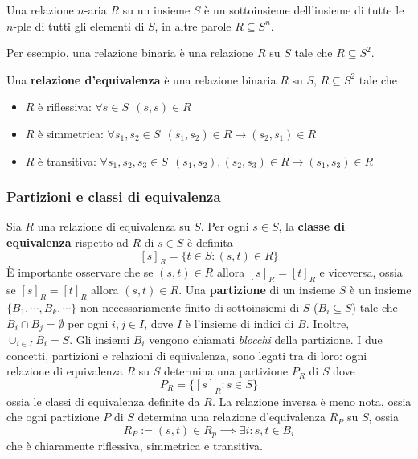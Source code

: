 \begin{defi}[Relazione]
  Una relazione $n$-aria $R$ su un insieme $S$ è 
un sottoinsieme dell'insieme di tutte le $n$-ple di tutti gli elementi di $S$, 
in altre parole $R \subseteq S^{n}$.
\end{defi}
Per esempio, una relazione binaria è 
una relazione $R$ su $S$ tale che $R \subseteq S^2$. 
\begin{defi}
Una 
\textbf{relazione d'equivalenza} è una relazione binaria $R$ su $S$, $R \subseteq S^2$ 
tale che 
\begin{itemize}
  \setlength\itemsep{0pt}
  \item $R$ è riflessiva: $\forall s \in S ~~(s,s) \in R$
  \item $R$ è simmetrica: $\forall s_1, s_2 \in S ~~ (s_1, s_2) \in R \rightarrow (s_2, s_1) \in R$
  \item $R$ è transitiva: $\forall s_1, s_2, s_3 \in S ~~ (s_1, s_2), (s_2, s_3) \in R \rightarrow (s_1, s_3) \in R$
\end{itemize}
\end{defi}

\subsubsection{Partizioni e classi di equivalenza}
Sia $R$ una relazione di equivalenza su $S$. Per ogni $s \in S$, la 
\textbf{classe di equivalenza} rispetto ad $R$ di $s \in S$ è definita 
$$
[s]_R = \{ t \in S : (s,t) \in R\}
$$
\`E importante osservare che se $(s,t) \in R$ allora $[s]_R = [t]_R$ e viceversa, 
ossia se $[s]_R = [t]_R$ allora $(s,t) \in R$.  Una \textbf{partizione} di 
un insieme $S$ è un insieme $\{B_1, \cdots, B_k, \cdots\}$ non necessariamente 
finito di sottoinsiemi di $S$ ($B_i \subseteq S$) tale che $B_i \cap B_j = \emptyset$ 
per ogni $i,j \in I$, dove $I$ è l'insieme di indici di $B$. Inoltre, 
$\cup_{i \in I} B_i = S$. Gli insiemi $B_i$ vengono chiamati \textit{blocchi}
della partizione. I due concetti, partizioni e relazioni di equivalenza, sono 
legati tra di loro: ogni relazione di equivalenza $R$ su $S$ determina una partizione 
$P_R$ di $S$ dove 
$$
P_R = \{[s]_R : s \in S\}
$$
ossia le classi di equivalenza definite da $R$. La relazione inversa è meno nota, 
ossia che ogni partizione $P$ di $S$ determina una relazione d'equivalenza $R_P$ 
su $S$, ossia 
$$ 
R_P := (s,t) \in R_p \implies \exists i : s,t \in B_i
$$
che è chiaramente riflessiva, simmetrica e transitiva. 

